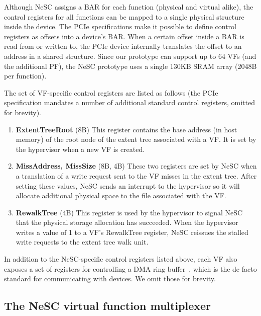 Although NeSC assigns a BAR for each function (physical and virtual alike), the control registers for all functions can be mapped to a single physical structure inside the device.
The PCIe specifications make it possible to define control registers as offsets into a device's BAR. When a certain offset inside a BAR is read from or written to, the PCIe device internally translates the offset to an address in a shared structure.
Since our prototype can support up to 64 VFs (and the additional PF), the NeSC prototype uses a single 130KB SRAM array (2048B per function).

The set of VF-specific control registers are listed as follows (the PCIe specification mandates a number of additional standard control registers, omitted for brevity).
\begin{enumerate}
\item
  \textbf{ExtentTreeRoot} (8B)\quad
  This register contains the base address (in host memory) of the root node of the extent tree associated with a VF. It is set by the hypervisor when a new VF is created. 
%
\item
  \textbf{MissAddress, MissSize} (8B, 4B)\quad
  These two registers are set by NeSC when a translation of a write request sent to the VF misses in the extent tree. After setting these values, NeSC sends an interrupt to the hypervisor so it will allocate additional physical space to the file associated with the VF.
%
\item
  \textbf{RewalkTree} (4B)\quad
  This register is used by the hypervisor to signal NeSC that the physical storage allocation has succeeded. When the hypervisor writes a value of 1 to a VF's RewalkTree register, NeSC reissues the stalled write requests to the extent tree walk unit.
\end{enumerate}

In addition to the NeSC-specific control registers listed above, each VF also exposes a set of registers for controlling a DMA ring buffer~\cite{love10lkd}, which is the de facto standard for communicating with devices. We omit those for brevity.


 

\subsection{The NeSC virtual function multiplexer}

